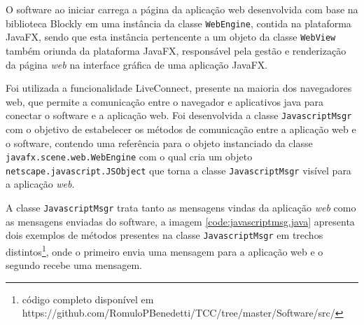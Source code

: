 \documentclass[tg]{mdtufsm}
\begin{document}
                O software ao iniciar carrega a página da aplicação web desenvolvida com base na biblioteca Blockly em uma instância da classe \texttt{WebEngine}, contida na plataforma JavaFX, sendo que esta instância pertencente a um objeto da classe \texttt{WebView} também oriunda da plataforma JavaFX, responsável pela gestão e renderização da página \emph{web} na interface gráfica de uma aplicação JavaFX.

                Foi utilizada a funcionalidade LiveConnect, presente na maioria dos navegadores web, que permite a comunicação entre o navegador e aplicativos java para conectar o software e a aplicação web. Foi desenvolvida a classe \texttt{JavascriptMsgr} com o objetivo de estabelecer os métodos de comunicação entre a aplicação web e o software, contendo uma referência para o objeto instanciado da classe \texttt{javafx.scene.web.WebEngine} com o qual cria um objeto \texttt{netscape.javascript.JSObject} que torna a classe \texttt{JavascriptMsgr} visível para a aplicação \emph{web}.

                A classe \texttt{JavascriptMsgr} trata tanto as mensagens vindas da aplicação \emph{web} como as mensagens enviadas do software, a imagem \ref{code:javascriptmsg.java} apresenta dois exemplos de métodos presentes na classe \texttt{JavascriptMsgr} em trechos distintos\footnote{código completo disponível em https://github.com/RomuloPBenedetti/TCC/tree/master/Software/src/}, onde o primeiro envia uma mensagem para a aplicação web e o segundo recebe uma mensagem.
\end{document}
